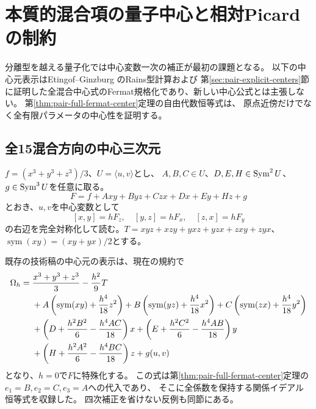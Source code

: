 \section{本質的混合項の量子中心と相対Picardの制約}
\label{sec:mixed-quantum-center}
分離型を越える量子化では中心変数一次の補正が最初の課題となる。
以下の中心元表示はEtingof--Ginzburg \cite[\S9]{EG} のRains型計算および
第\ref{sec:pair-explicit-centers}節に証明した全混合中心式のFermat規格化であり、新しい中心公式とは主張しない。
第\ref{thm:pair-full-fermat-center}定理の自由代数恒等式は、
原点近傍だけでなく全有限パラメータの中心性を証明する。

\subsection{全15混合方向の中心三次元}
$f=(x^3+y^3+z^3)/3$、$U=\langle u,v\rangle$とし、
$A,B,C\in U$、$D,E,H\in\operatorname{Sym}^2U$、$g\in\operatorname{Sym}^3U$を任意に取る。
\begin{equation}\label{eq:full-mixed-fermat}
 F=f+Axy+Byz+Czx+Dx+Ey+Hz+g
\end{equation}
とおき、$u,v$を中心変数として
\begin{equation}\label{eq:full-mixed-brackets}
 [x,y]=hF_z,\quad[y,z]=hF_x,\quad[z,x]=hF_y
\end{equation}
の右辺を完全対称化して読む。$T=xyz+xzy+yxz+yzx+zxy+zyx$、
$\operatorname{sym}(xy)=(xy+yx)/2$とする。

\begin{remark}[既存原稿の全混合中心元と検算状態]\label{rem:full-mixed-center}
既存の技術稿の中心元の表示は、現在の規約で
\begin{align}\label{eq:full-mixed-center}
\Omega_h={}&\frac{x^3+y^3+z^3}{3}-\frac{h^2}{9}T\notag\\
&+A\left(\operatorname{sym}(xy)+\frac{h^4}{18}z^2\right)
 +B\left(\operatorname{sym}(yz)+\frac{h^4}{18}x^2\right)
 +C\left(\operatorname{sym}(zx)+\frac{h^4}{18}y^2\right)\notag\\
&+\left(D+\frac{h^2B^2}{6}-\frac{h^4AC}{18}\right)x
 +\left(E+\frac{h^2C^2}{6}-\frac{h^4AB}{18}\right)y\notag\\
&+\left(H+\frac{h^2A^2}{6}-\frac{h^4BC}{18}\right)z+g(u,v)
\end{align}
となり、$h=0$で$F$に特殊化する。
この式は第\ref{thm:pair-full-fermat-center}定理の$e_1=B,e_2=C,e_3=A$への代入であり、
そこに全係数を保持する関係イデアル恒等式を収録した。
四次補正を省けない反例も同節にある。
\end{remark}

